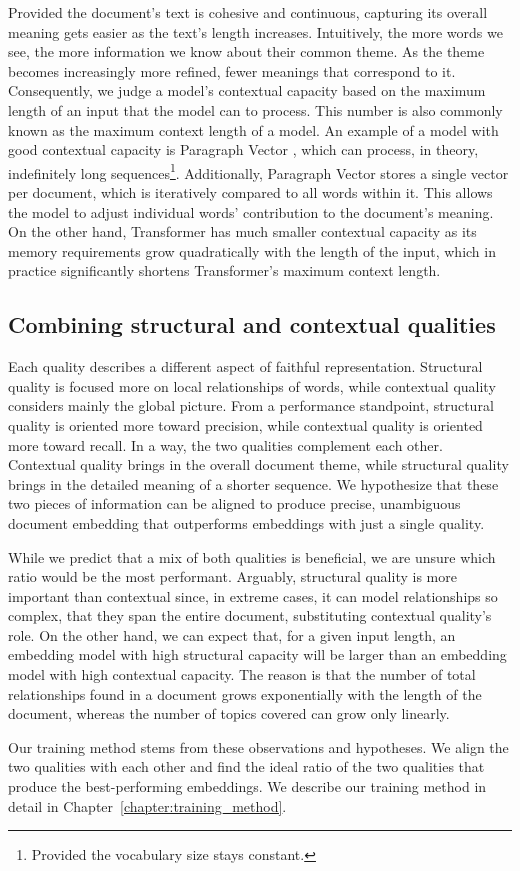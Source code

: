 Provided the document's text is cohesive and continuous, capturing its overall
meaning gets easier as the text's length increases. Intuitively, the more words
we see, the more information we know about their common theme. As the theme
becomes increasingly more refined, fewer meanings that correspond to it.
Consequently, we judge a model's contextual capacity based on the maximum
length of an input that the model can to process. This number is also commonly
known as the maximum context length of a model. An example of a model with good
contextual capacity is Paragraph Vector \citep{le2014distributed}, which can
process, in theory, indefinitely long sequences\footnote{Provided the
vocabulary size stays constant.}. Additionally, Paragraph Vector stores a
single vector per document, which is iteratively compared to all words within
it. This allows the model to adjust individual words' contribution to the
document's meaning. On the other hand, Transformer \citep{vaswani2017attention}
has much smaller contextual capacity as its memory requirements grow
quadratically with the length of the input, which in practice significantly
shortens Transformer's maximum context length.

\subsection{Combining structural and contextual
qualities}\label{section:combine_structural_and_contextual}



Each quality describes a different aspect of faithful representation.
Structural quality is focused more on local relationships of words, while
contextual quality considers mainly the global picture. From a performance
standpoint, structural quality is oriented more toward precision, while
contextual quality is oriented more toward recall. In a way, the two qualities
complement each other. Contextual quality brings in the overall document theme,
while structural quality brings in the detailed meaning of a shorter sequence.
We hypothesize that these two pieces of information can be aligned to produce
precise, unambiguous document embedding that outperforms embeddings
with just a single quality.

While we predict that a mix of both qualities is beneficial, we are unsure
which ratio would be the most performant. Arguably, structural quality is more
important than contextual since, in extreme cases, it can model relationships
so complex, that they span the entire document, substituting contextual
quality’s role. On the other hand, we can expect that, for a given input
length, an embedding model with high structural capacity will be larger than an
embedding model with high contextual capacity. The reason is that the number of
total relationships found in a document grows exponentially with the length of
the document, whereas the number of topics covered can grow only linearly.

Our training method stems from these observations and hypotheses. We align the
two qualities with each other and find the ideal ratio of the two qualities
that produce the best-performing embeddings. We describe our training method
in detail in Chapter~\ref{chapter:training_method}.

